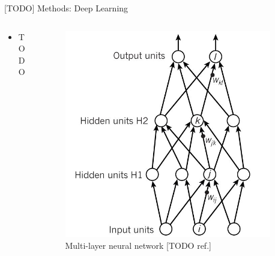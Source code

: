 \documentclass[final,hyperref={pdfpagelabels=false}]{beamer}
\begin{document}
\begin{frame}[t]
\begin{columns}[t]
\begin{column}{.03\textwidth}\end{column} %
 
\begin{column}{.465\textwidth} %



\begin{block}{[TODO] Methods: Deep Learning}

\begin{columns} %
\begin{column}{.4\textwidth} %
\begin{itemize}
\item TODO
\end{itemize}
\end{column}

\begin{column}{.6\textwidth} %
\centering

\begin{figure}
\includegraphics[width=.6\linewidth]{nature-deep-learning/fig_1c}
\caption{Multi-layer neural network [TODO ref.]}
\end{figure}


\end{column}
\end{columns}
\end{block}
\end{column}
\end{columns}
\end{frame}
\end{document}
